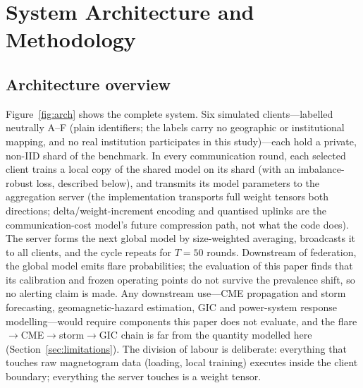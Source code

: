 \section{System Architecture and Methodology}\label{sec:method}

\subsection{Architecture overview}

\begin{sloppypar}
Figure~\ref{fig:arch} shows the complete system. Six simulated
clients---labelled neutrally A--F (plain identifiers; the labels
carry no geographic or institutional mapping, and no real institution
participates in this study)---each hold a private, non-IID shard of the
benchmark. In every communication round, each selected
client trains a local copy of the shared model on its shard (with an
imbalance-robust loss, described below), and transmits its model
parameters to the aggregation server (the implementation transports
full weight tensors both directions; delta/weight-increment encoding
and quantised uplinks are the communication-cost model's future
compression path, not what the code does). The server forms the next global
model by size-weighted averaging, broadcasts it to all clients, and
the cycle repeats for $T = 50$ rounds. Downstream of federation, the
global model emits flare probabilities; the evaluation of this paper
finds that its calibration and frozen operating points do not survive
the prevalence shift, so no alerting claim is made. Any downstream
use---CME propagation and storm forecasting, geomagnetic-hazard
estimation, GIC and power-system response modelling---would require
components this paper does not evaluate, and the
flare$\to$CME$\to$storm$\to$GIC chain is far from the quantity
modelled here (Section~\ref{sec:limitations}). The division of labour
is deliberate: everything that touches raw magnetogram data (loading,
local training) executes inside the client boundary; everything the
server touches is a weight tensor.
\end{sloppypar}

